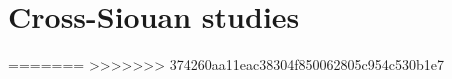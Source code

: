 \documentclass[output=short             %
	        ,collection
	        ,collectionchapter
	        ,collectiontoclongg
		,draft
		,draftmode
 	        ,biblatex  
		  ]{langsci/langscibook}
\begin{document}
\part{Cross-Siouan studies}

=======
%
%
%
%
>>>>>>> 374260aa11eac38304f850062805c954c530b1e7




\end{document}
